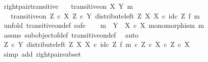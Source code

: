 \begin{isabellebody}
\isanewline
{}\isamarkupfalse%
%
\endisatagproof
{\isafoldproof}%
%
\isadelimproof
\isanewline
%
\endisadelimproof
\isanewline
{}\isamarkupfalse%
\ right{\isacharunderscore}{\kern0pt}pair{\isacharunderscore}{\kern0pt}transitive{\isacharcolon}{\kern0pt}\isanewline
\ \ \ {\isachardoublequoteopen}transitive{\isacharunderscore}{\kern0pt}on\ X\ {\isacharparenleft}{\kern0pt}Y{\isacharcomma}{\kern0pt}\ m{\isacharparenright}{\kern0pt}{\isachardoublequoteclose}\isanewline
\ \ \ {\isachardoublequoteopen}transitive{\isacharunderscore}{\kern0pt}on\ {\isacharparenleft}{\kern0pt}Z\ {\isasymtimes}\isactrlsub c\ X{\isacharparenright}{\kern0pt}\ {\isacharparenleft}{\kern0pt}Z\ {\isasymtimes}\isactrlsub c\ Y{\isacharcomma}{\kern0pt}\ distribute{\isacharunderscore}{\kern0pt}left\ Z\ X\ X\ {\isasymcirc}\isactrlsub c\ {\isacharparenleft}{\kern0pt}id\isactrlsub c\ Z\ {\isasymtimes}\isactrlsub f\ m{\isacharparenright}{\kern0pt}{\isacharparenright}{\kern0pt}{\isachardoublequoteclose}\isanewline
%
\isadelimproof
%
\endisadelimproof
%
\isatagproof
{}\isamarkupfalse%
\ {\isacharparenleft}{\kern0pt}unfold\ transitive{\isacharunderscore}{\kern0pt}on{\isacharunderscore}{\kern0pt}def{\isacharcomma}{\kern0pt}\ safe{\isacharparenright}{\kern0pt}\isanewline
\ \ \isamarkupfalse%
\ {\isachardoublequoteopen}m\ {\isacharcolon}{\kern0pt}\ Y\ {\isasymrightarrow}\ X\ {\isasymtimes}\isactrlsub c\ X{\isachardoublequoteclose}\ {\isachardoublequoteopen}monomorphism\ m{\isachardoublequoteclose}\isanewline
\ \ \ \ \isamarkupfalse%
\ assms\ subobject{\isacharunderscore}{\kern0pt}of{\isacharunderscore}{\kern0pt}def{}\ transitive{\isacharunderscore}{\kern0pt}on{\isacharunderscore}{\kern0pt}def\ \isamarkupfalse%
\ auto\isanewline
\ \ \isamarkupfalse%
\ \isamarkupfalse%
\ {\isachardoublequoteopen}{\isacharparenleft}{\kern0pt}Z\ {\isasymtimes}\isactrlsub c\ Y{\isacharcomma}{\kern0pt}\ distribute{\isacharunderscore}{\kern0pt}left\ Z\ X\ X\ {\isasymcirc}\isactrlsub c\ id\isactrlsub c\ Z\ {\isasymtimes}\isactrlsub f\ m{\isacharparenright}{\kern0pt}\ {\isasymsubseteq}\isactrlsub c\ {\isacharparenleft}{\kern0pt}Z\ {\isasymtimes}\isactrlsub c\ X{\isacharparenright}{\kern0pt}\ {\isasymtimes}\isactrlsub c\ Z\ {\isasymtimes}\isactrlsub c\ X{\isachardoublequoteclose}\isanewline
\ \ \ \ \isamarkupfalse%
\ {\isacharparenleft}{\kern0pt}simp\ add{\isacharcolon}{\kern0pt}\ right{\isacharunderscore}{\kern0pt}pair{\isacharunderscore}{\kern0pt}subset{\isacharparenright}{\kern0pt}\isanewline

\end{isabellebody}
